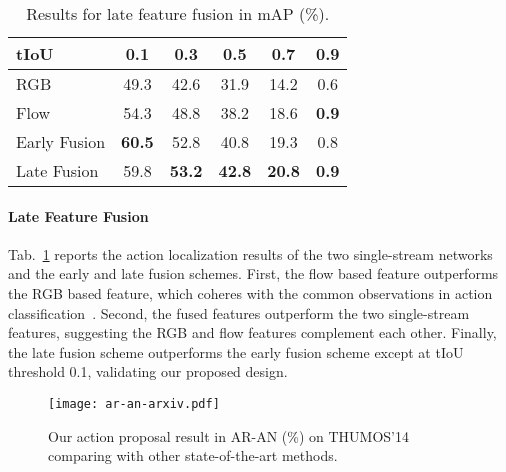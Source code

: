 \documentclass[10pt,twocolumn,letterpaper]{article}
\newcommand\Tstrut{\rule{0pt}{2.2ex}}       \newcommand\Bstrut{\rule[-1.0ex]{0pt}{0pt}} \newcommand{\TBstrut}{\Tstrut\Bstrut}
\begin{document}
\begin{table}[t]
\centering
 \small
\begin{tabular}{l||ccccc}
  \hline \TBstrut
  tIoU            & 0.1           & 0.3           & 0.5           & 0.7           & 0.9           \\
  \hline \Tstrut
  RGB             & 49.3          & 42.6          & 31.9          & 14.2          & 0.6           \\ \Bstrut
  Flow            & 54.3          & 48.8          & 38.2          & 18.6          & \textbf{0.9}  \\ \hline \Tstrut
  Early Fusion    & \textbf{60.5} & 52.8          & 40.8          & 19.3          & 0.8           \\ \Bstrut
  Late Fusion     & 59.8          & \textbf{53.2} & \textbf{42.8} & \textbf{20.8} & \textbf{0.9}  \\
  \hline
 \end{tabular}
 \vspace{-2mm}
 \caption{\small Results for late feature fusion in mAP (\%).}
\vspace{-2mm} \label{tab:late_fusion}
\end{table}

\vspace{-3mm}

\paragraph{Late Feature Fusion} Tab.~\ref{tab:late_fusion} reports the action
localization results of the two single-stream networks and the early and late
fusion schemes. First, the flow based feature outperforms the RGB based
feature, which coheres with the common observations in action
classification~\cite{simonyan:nips2014,wang:eccv2016,carreira:cvpr2017,feichtenhofer:cvpr2017}.
Second, the fused features outperform the two single-stream features,
suggesting the RGB and flow features complement each other. Finally, the late
fusion scheme outperforms the early fusion scheme except at tIoU threshold 0.1,
validating our proposed design.

\begin{figure}[t]
\centering
 \texttt{[image: ar-an-arxiv.pdf]}
 \vspace{-1mm}
 \caption{\small Our action proposal result in AR-AN (\%) on THUMOS'14
comparing with other state-of-the-art methods.}
 \vspace{-2mm}
 \label{fig:benchmark-proposal}
\end{figure}
\end{document}
